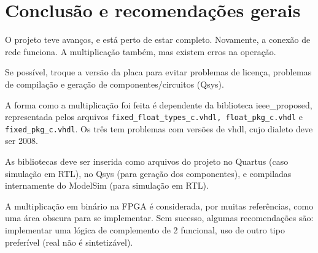 \documentclass [12pt,oneside] {article}
\begin{document}
\newpage
\section{Conclusão e recomendações gerais}

	O projeto teve avanços, e está perto de estar completo.
Novamente, a conexão de rede funciona. A multiplicação também, mas existem erros na
operação.

	Se possível, troque a versão da placa para evitar problemas de
licença, problemas de compilação e geração de componentes/circuitos
(Qsys).

	A forma como a multiplicação foi feita é dependente da
biblioteca ieee\_proposed, representada pelos arquivos
\texttt{fixed\_float\_types\_c.vhdl, float\_pkg\_c.vhdl} e
\texttt{fixed\_pkg\_c.vhdl}. Os três
tem problemas com versões de vhdl, cujo dialeto deve ser 2008.

	As bibliotecas deve ser inserida como arquivos do projeto no
Quartus (caso simulação em RTL), no Qsys (para geração dos
componentes), e compiladas internamente do ModelSim (para simulação em
RTL).

	A multiplicação em binário na FPGA é considerada, por muitas
referências, como uma área obscura para se implementar. Sem sucesso,
algumas recomendações são: implementar uma lógica de complemento de 2
funcional, uso de outro tipo preferível (real não é sintetizável).
\end{document}
